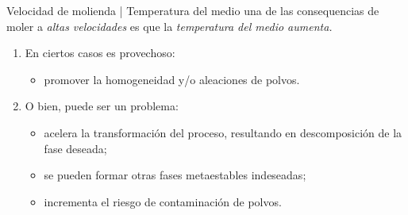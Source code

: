 \documentclass[%
spanish,
progressbar=head,
background=dark,
subsectionpage
]{beamer}
\begin{document}
\begin{frame}{Velocidad de molienda | Temperatura del medio}
    una de las consequencias de moler a \emph{altas velocidades} es que la \emph{temperatura del medio aumenta.}
    \begin{enumerate}
            \item En ciertos casos es provechoso:
            \begin{itemize}
                \item promover la homogeneidad y/o aleaciones de polvos.
            \end{itemize}
            \item O bien, puede ser un problema:
            \begin{itemize}
                \item acelera la transformación del proceso, resultando en descomposición de la fase deseada;
                \item se pueden formar otras fases metaestables indeseadas;
                \item incrementa el riesgo de contaminación de polvos.
            \end{itemize}
        \end{enumerate}
\end{frame}
\end{document}

